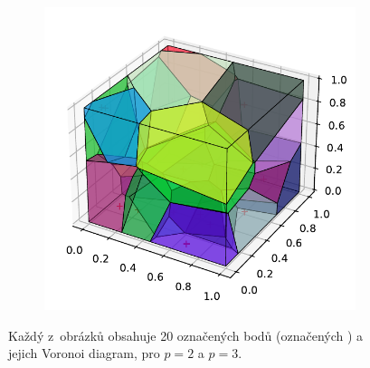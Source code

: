 \begin{figure}

     \begin{subfigure}[b]{0.45\textwidth}
     
\centering
{}


\end{subfigure}
     \begin{subfigure}[b]{\textwidth}
     \includegraphics[scale=0.7]{obrazky-figures/nn/voronoi_3D.pdf}
     
     \end{subfigure}



\caption{Každý z~obrázků obsahuje 20 označených bodů (označených \uv{+}) a jejich Voronoi diagram, pro $p = 2$ a $p = 3$.}
\label{voro_def}

     
\end{figure}

